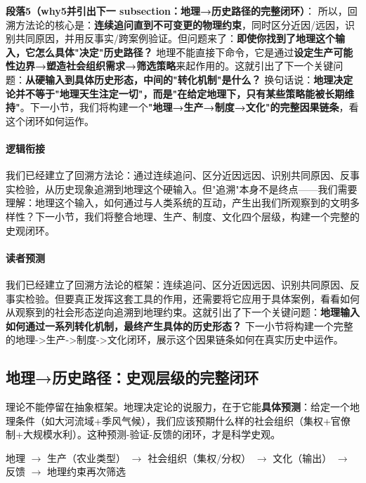\documentclass[../main.tex]{subfiles}
\begin{document}
	\textbf{段落5（why5并引出下一 subsection：地理→历史路径的完整闭环）}：  
	所以，回溯方法论的核心是：\textbf{连续追问直到不可变更的物理约束}，同时区分近因/远因，识别共同原因，并用反事实/跨案例验证。但问题来了：\textbf{即使你找到了地理这个输入，它怎么具体"决定"历史路径？} 地理不能直接下命令，它是通过\textbf{设定生产可能性边界→塑造社会组织需求→筛选策略}来起作用的。这就引出了下一个关键问题：\textbf{从硬输入到具体历史形态，中间的"转化机制"是什么？} 换句话说：\textbf{地理决定论并不等于"地理天生注定一切"，而是"在给定地理下，只有某些策略能被长期维持"}。下一小节，我们将构建一个\textbf{"地理→生产→制度→文化"的完整因果链条}，看这个闭环如何运作。
	
	\paragraph*{逻辑衔接}
	我们已经建立了回溯方法论：通过连续追问、区分近因远因、识别共同原因、反事实检验，从历史现象追溯到地理这个硬输入。但"追溯"本身不是终点——我们需要理解：地理这个输入，如何通过与人类系统的互动，产生出我们所观察到的文明多样性？下一小节，我们将整合地理、生产、制度、文化四个层级，构建一个完整的史观闭环。
	
	\paragraph*{读者预测}
	我们已经建立了回溯方法论的框架：连续追问、区分近因远因、识别共同原因、反事实检验。但要真正发挥这套工具的作用，还需要将它应用于具体案例，看看如何从观察到的社会形态逆向追溯到地理约束。这就引出了下一个关键问题：\textbf{地理输入如何通过一系列转化机制，最终产生具体的历史形态？} 下一小节将构建一个完整的地理->生产->制度->文化闭环，展示这个因果链条如何在真实历史中运作。

	\subsection{地理→历史路径：史观层级的完整闭环}
	
	\begin{motivation}
		理论不能停留在抽象框架。地理决定论的说服力，在于它能\textbf{具体预测}：给定一个地理条件（如大河流域+季风气候），我们应该预期什么样的社会组织（集权+官僚制+大规模水利）。这种预测-验证-反馈的闭环，才是科学史观。
	\end{motivation}
	
	\begin{logicmap}
		地理 $\rightarrow$ 生产（农业类型） $\rightarrow$ 社会组织（集权/分权） $\rightarrow$ 文化（输出） $\rightarrow$ 反馈 $\rightarrow$ 地理约束再次筛选
	\end{logicmap}
	
\end{document}
